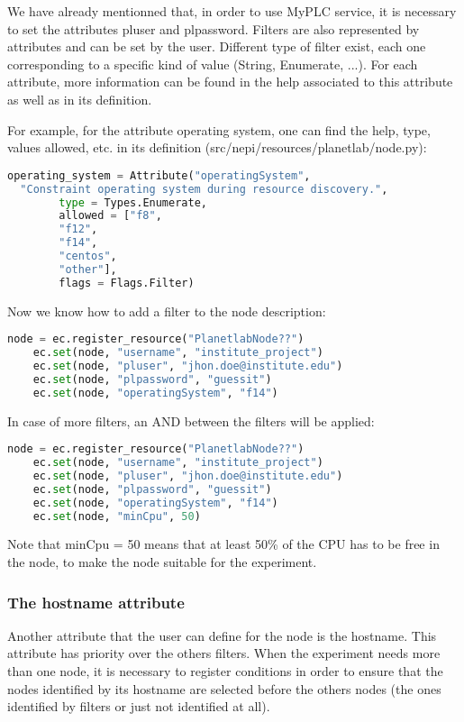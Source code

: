 We have already mentionned that, in order to use MyPLC service, it is necessary to set the attributes pluser and plpassword.  Filters are also represented by attributes and can be set by the user. Different type of filter exist, each one corresponding to a specific kind of value (String, Enumerate, ...). For each attribute, more information can be found in the help associated to this attribute as well as in its definition.

For example, for the attribute operating system, one can find the help, type, values allowed, etc. in its definition (src/nepi/resources/planetlab/node.py):
\begin{lstlisting}[language=Python]
operating_system = Attribute("operatingSystem", 
  "Constraint operating system during resource discovery.",
        type = Types.Enumerate,
        allowed = ["f8",
        "f12",
        "f14",
        "centos",
        "other"],
        flags = Flags.Filter)
\end{lstlisting}
Now we know how to add a filter to the node description:
\begin{lstlisting}[language=Python]
    node = ec.register_resource("PlanetlabNode??")
    ec.set(node, "username", "institute_project")
    ec.set(node, "pluser", "​​jhon.doe@institute.edu")
    ec.set(node, "plpassword", "guessit")
    ec.set(node, "operatingSystem", "f14")
\end{lstlisting}
In case of more filters, an AND between the filters will be applied:

\begin{lstlisting}[language=Python]
    node = ec.register_resource("PlanetlabNode??")
    ec.set(node, "username", "institute_project")
    ec.set(node, "pluser", "​​jhon.doe@institute.edu")
    ec.set(node, "plpassword", "guessit")
    ec.set(node, "operatingSystem", "f14")
    ec.set(node, "minCpu", 50)
\end{lstlisting}

Note that minCpu = 50 means that at least 50\% of the CPU has to be free in the node, to make the node suitable for the experiment.


\subsubsection{The hostname attribute}

Another attribute that the user can define for the node is the hostname. This attribute has priority over the others filters. When the experiment needs more than one node, it is necessary to register conditions in order to ensure that the nodes identified by its hostname are selected before the others nodes (the ones identified by filters or just not identified at all).

